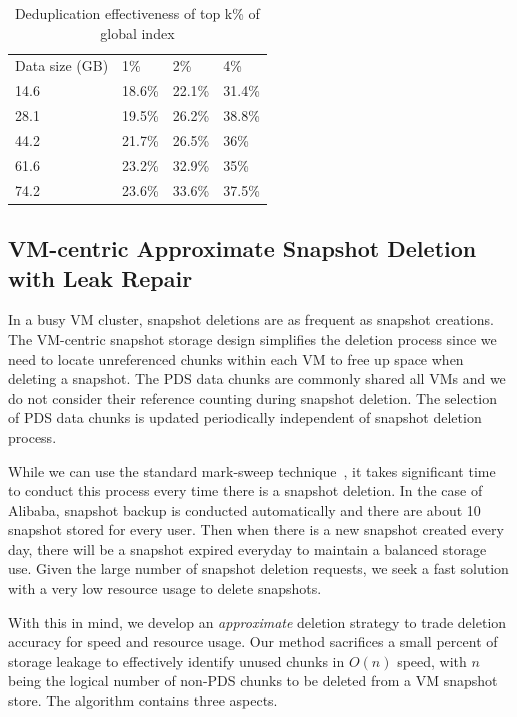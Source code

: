{\begin{table}
    \begin{tabular}{llll}
    Data size (GB) & 1\%    & 2\%    & 4\%    \\
    14.6           & 18.6\% & 22.1\% & 31.4\% \\
    28.1           & 19.5\% & 26.2\% & 38.8\% \\
    44.2           & 21.7\% & 26.5\% & 36\%   \\
    61.6           & 23.2\% & 32.9\% & 35\%   \\
    74.2           & 23.6\% & 33.6\% & 37.5\% \\
    \end{tabular}
    \caption{Deduplication effectiveness of top k\% of global index}
    \label{tab:cds}
\end{table}

}

\subsection{ VM-centric Approximate Snapshot Deletion with Leak Repair}

In a busy VM cluster, snapshot deletions are as frequent as snapshot creations.
The VM-centric snapshot storage design simplifies the deletion process since we need to locate unreferenced chunks within each VM to free up space when deleting a snapshot.
The PDS data chunks are commonly shared all VMs and we do not consider their reference
counting  during snapshot deletion.
The selection of PDS data chunks   is updated periodically independent of snapshot deletion process.

While we can use the standard mark-sweep technique~\cite{mark-sweep}, 
it takes significant time to conduct this process every time there is a snapshot deletion.
In the case of Alibaba, snapshot backup is conducted automatically and there are 
about 10 snapshot stored for  every user. Then when there is
a new snapshot created every day,  there will be  a snapshot expired everyday to maintain
a balanced storage use. Given the large number of snapshot deletion requests, we seek
a fast solution with a very low resource usage to delete snapshots.

With this in mind, we develop an {\em approximate} deletion strategy to trade deletion accuracy for
speed and resource usage. Our method sacrifices a small percent of storage leakage
to effectively identify unused chunks in $O(n)$ speed, with $n$ being the logical number of non-PDS chunks 
to be deleted from a VM snapshot store.
The algorithm contains three aspects.


